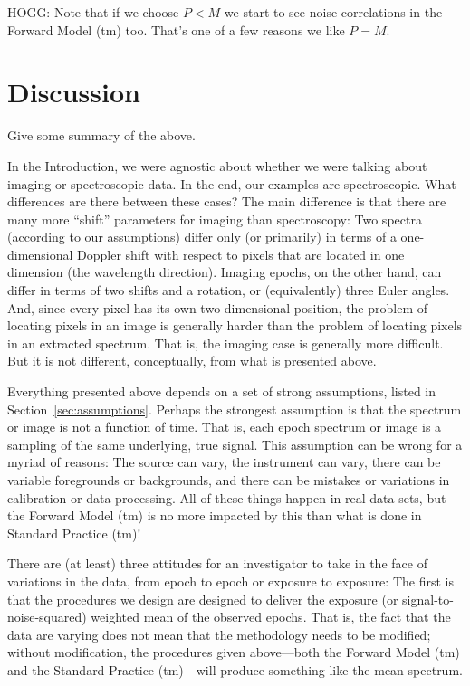 \documentclass[modern]{aastex631}
\newcommand{\sectionname}{Section}
\begin{document}
HOGG: Note that if we choose $P<M$ we start to see noise correlations in the Forward Model (tm) too.
That's one of a few reasons we like $P=M$.

\section{Discussion}\label{sec:discussion}

Give some summary of the above.

In the Introduction, we were agnostic about whether we were talking about imaging or spectroscopic data.
In the end, our examples are spectroscopic.
What differences are there between these cases?
The main difference is that there are many more ``shift'' parameters for imaging than spectroscopy:
Two spectra (according to our assumptions) differ only (or primarily) in terms of a one-dimensional Doppler shift with respect to pixels that are located in one dimension (the wavelength direction).
Imaging epochs, on the other hand, can differ in terms of two shifts and a rotation, or (equivalently) three Euler angles.
And, since every pixel has its own two-dimensional position, the problem of locating pixels in an image is generally harder than the problem of locating pixels in an extracted spectrum.
That is, the imaging case is generally more difficult.
But it is not different, conceptually, from what is presented above.

Everything presented above depends on a set of strong assumptions, listed in \sectionname~\ref{sec:assumptions}.
Perhaps the strongest assumption is that the spectrum or image is not a function of time.
That is, each epoch spectrum or image is a sampling of the same underlying, true signal.
This assumption can be wrong for a myriad of reasons:
The source can vary, the instrument can vary, there can be variable foregrounds or backgrounds, and there can be mistakes or variations in calibration or data processing.
All of these things happen in real data sets, but the Forward Model (tm) is no more impacted by this than what is done in Standard Practice (tm)!

There are (at least) three attitudes for an investigator to take in the face of variations in the data, from epoch to epoch or exposure to exposure:
The first is that the procedures we design are designed to deliver the exposure (or signal-to-noise-squared) weighted mean of the observed epochs.
That is, the fact that the data are varying does not mean that the methodology needs to be modified; without modification, the procedures given above---both the Forward Model (tm) and the Standard Practice (tm)---will produce something like the mean spectrum.
\end{document}
